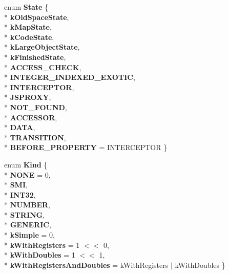 \begin{DoxyCompactItemize}
\item 
enum {\bfseries State} \{ \\*
{\bfseries k\+Old\+Space\+State}, 
\\*
{\bfseries k\+Map\+State}, 
\\*
{\bfseries k\+Code\+State}, 
\\*
{\bfseries k\+Large\+Object\+State}, 
\\*
{\bfseries k\+Finished\+State}, 
\\*
{\bfseries A\+C\+C\+E\+S\+S\+\_\+\+C\+H\+E\+CK}, 
\\*
{\bfseries I\+N\+T\+E\+G\+E\+R\+\_\+\+I\+N\+D\+E\+X\+E\+D\+\_\+\+E\+X\+O\+T\+IC}, 
\\*
{\bfseries I\+N\+T\+E\+R\+C\+E\+P\+T\+OR}, 
\\*
{\bfseries J\+S\+P\+R\+O\+XY}, 
\\*
{\bfseries N\+O\+T\+\_\+\+F\+O\+U\+ND}, 
\\*
{\bfseries A\+C\+C\+E\+S\+S\+OR}, 
\\*
{\bfseries D\+A\+TA}, 
\\*
{\bfseries T\+R\+A\+N\+S\+I\+T\+I\+ON}, 
\\*
{\bfseries B\+E\+F\+O\+R\+E\+\_\+\+P\+R\+O\+P\+E\+R\+TY} = I\+N\+T\+E\+R\+C\+E\+P\+T\+OR
 \}\hypertarget{classv8_1_1internal_1_1_b_a_s_e___e_m_b_e_d_d_e_d_aea5e836b2c351dd71777783bbf36881f}{}\label{classv8_1_1internal_1_1_b_a_s_e___e_m_b_e_d_d_e_d_aea5e836b2c351dd71777783bbf36881f}

\item 
enum {\bfseries Kind} \{ \\*
{\bfseries N\+O\+NE} = 0, 
\\*
{\bfseries S\+MI}, 
\\*
{\bfseries I\+N\+T32}, 
\\*
{\bfseries N\+U\+M\+B\+ER}, 
\\*
{\bfseries S\+T\+R\+I\+NG}, 
\\*
{\bfseries G\+E\+N\+E\+R\+IC}, 
\\*
{\bfseries k\+Simple} = 0, 
\\*
{\bfseries k\+With\+Registers} = 1 $<$$<$ 0, 
\\*
{\bfseries k\+With\+Doubles} = 1 $<$$<$ 1, 
\\*
{\bfseries k\+With\+Registers\+And\+Doubles} = k\+With\+Registers $\vert$ k\+With\+Doubles
 \}\hypertarget{classv8_1_1internal_1_1_b_a_s_e___e_m_b_e_d_d_e_d_a597b8e57ea3ef503b8b2b9e3a70f42fa}{}\label{classv8_1_1internal_1_1_b_a_s_e___e_m_b_e_d_d_e_d_a597b8e57ea3ef503b8b2b9e3a70f42fa}


\end{DoxyCompactItemize}
